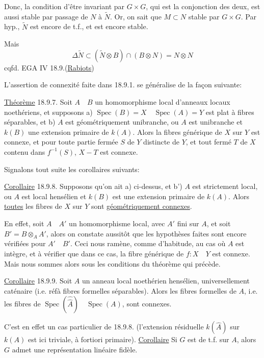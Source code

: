 Donc, la condition d'être invariant par $G\times G$, qui est la conjonction des deux, est aussi stable par passage de $N$ à $\tilde N$. Or, on sait que $M\subset N$  stable par $G\times G$. Par hyp., $\tilde N$ est encore de t.f.,  et est encore stable. 

Mais 
\[
\Delta\tilde N\subset(\tilde N\otimes B)\cap(B\otimes N)=N\otimes N
\]
cqfd.
EGA IV 18.9.\qquad (\uline{Rabiots})

L'assertion de connexité faite dans 18.9.1. se généralise de la façon suivante:

\uline{Théorème} 18.9.7. Soit $A\quad B$ un homomorphisme local d'anneaux locaux noethériens, et supposons a)  $\operatorname{Spec}(B)=X\quad\operatorname{Spec}(A)=Y$ est plat à fibres séparables, et b) $A$ est géométriquement unibranche, ou $A$ est unibranche et $k(B)$ une extension primaire de $k(A)$. Alors la fibres générique de $X$ sur $Y$ est connexe, et pour toute partie fermée $S$ de $Y$ distincte de $Y$,  et tout fermé $T$ de $X$ contenu dans $f^{-1}(S)$, $X-T$ est connexe.

Signalons tout  suite les corollaires suivants:

\uline{Corollaire} 18.9.8. Supposons qu'on ait a) ci-dessus, et b') $A$ est strictement local, ou $A$ est local hensélien et $k(B)$ est une extension primaire de $k(A)$. Alors \uline{toutes} les fibres de $X$ sur $Y$ sont \uline{géométriquement connexes}.

En effet, soit $A\quad A'$ un homomorphisme local, avec $A'$ fini sur $A$, et soit $B'=B\otimes_A A'$, alors on constate aussitôt que les hypothèses faites sont encore vérifiées pour $A'\quad B'$. Ceci nous ramène, comme d'habitude, au cas où $A$ est intègre, et à vérifier que dans ce cas, la fibre générique de $f:X\quad Y$ est connexe. Mais nous sommes alors sous les conditions du théorème qui précède.

\uline{Corollaire} 18.9.9. Soit $A$ un anneau local noethérien hensélien,  universellement caténaire (i.e. réf\quad à fibres formelles séparables). Alors les fibres formelles de $A$, i.e. les fibres de $\operatorname{Spec}(\hat{\hat A})\quad\operatorname{Spec}(A)$, sont  connexes.

C'est en effet un cas particulier de 18.9.8. (l'extension résiduelle $k(\hat A)$ sur $k(A)$ est ici triviale, à fortiori primaire).
\uline{Corollaire} Si  $G$ est de t.f. sur $A$, alors $G$ admet une représentation linéaire fidèle.

